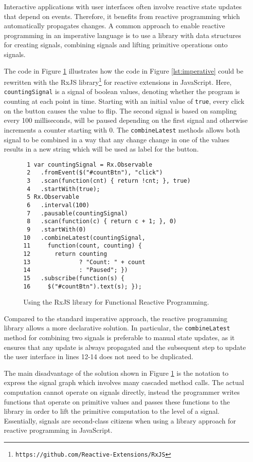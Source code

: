 \documentclass{sig-alternate-05-2015}
\begin{document}
Interactive applications with user interfaces often involve reactive state updates that depend on events.  Therefore, it benefits from reactive programming which automatically propagates changes.  A common approach to enable reactive programming in an imperative language is to use a library with data structures for creating signals, combining signals and lifting primitive operations onto signals.

The code in Figure \ref{lst:rxjs} illustrates how the code in Figure \ref{lst:imperative} could be rewritten with the RxJS library\footnote{\texttt{https://github.com/Reactive-Extensions/RxJS}} for reactive extensions in JavaScript.  Here, \lstinline+countingSignal+ is a signal of boolean values, denoting whether the program is counting at each point in time.  Starting with an initial value of \lstinline+true+, every click on the button causes the value to flip.  The second signal is based on sampling every 100 milliseconds, will be paused depending on the first signal and otherwise increments a counter starting with 0.  The \lstinline+combineLatest+ methods allows both signal to be combined in a way that any change change in one of the values results in a new string which will be used as label for the button.

\begin{figure}
\begin{lstlisting}
 1 var countingSignal = Rx.Observable
 2   .fromEvent($("#countBtn"), "click")
 3   .scan(function(cnt) { return !cnt; }, true)
 4   .startWith(true);
 5 Rx.Observable
 6   .interval(100)
 7   .pausable(countingSignal)
 8   .scan(function(c) { return c + 1; }, 0)
 9   .startWith(0)
10   .combineLatest(countingSignal,
11     function(count, counting) {
12       return counting
13              ? "Count: " + count
14              : "Paused"; })
15   .subscribe(function(s) {
16     $("#countBtn").text(s); });\end{lstlisting}
\caption{Using the RxJS library for Functional Reactive Programming.}
\label{lst:rxjs}
\end{figure}

Compared to the standard imperative approach, the reactive programming library allows a more declarative solution.  In particular, the \lstinline+combineLatest+ method for combining two signals is preferable to manual state updates, as it ensures that any update is always propagated and the subsequent step to update the user interface in lines 12-14 does not need to be duplicated.

The main disadvantage of the solution shown in Figure \ref{lst:rxjs} is the notation to express the signal graph which involves many cascaded method calls.  The actual computation cannot operate on signals directly, instead the programmer writes functions that operate on primitive values and passes these functions to the library in order to lift the primitive computation to the level of a signal.  Essentially, signals are second-class citizens when using a library approach for reactive programming in JavaScript.
\end{document}
